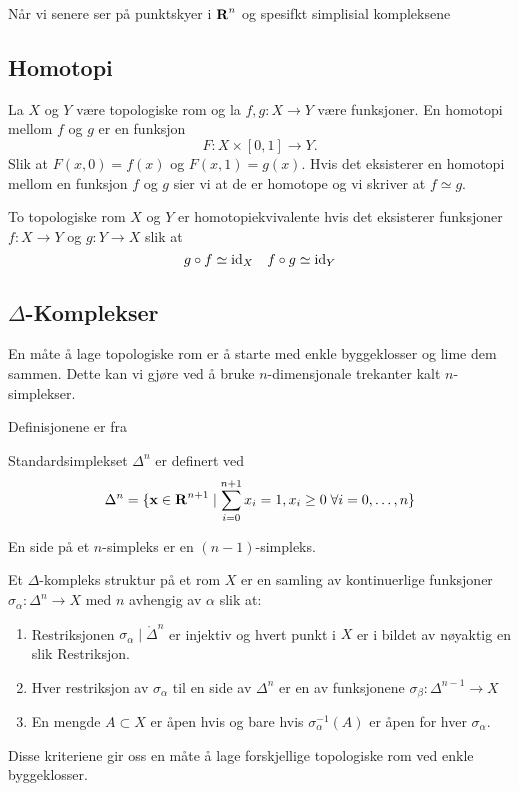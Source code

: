 Når vi senere ser på punktskyer i $\textnormal{\textbf{{R}}}^n$ og spesifkt simplisial kompleksene %

\subsection{Homotopi}\label{sec:Homotopi}
\begin{definisjon}\label{Def:Homotopi}
    La $X$ og $Y$ være topologiske rom og la $f,g: X\to Y$ være funksjoner. En homotopi mellom $f$ og $g$ er en funksjon
    \[F: X\times[0,1]\to Y.\]
    Slik at $F(x,0)=f(x)$ og $F(x,1)=g(x)$.
    Hvis det eksisterer en homotopi mellom en funksjon $f$ og $g$ sier vi at de er homotope og vi skriver at $f\simeq g$.
\end{definisjon}

\begin{definisjon}\label{Def:HomotopiEkv}
    To topologiske rom $X$ og $Y$ er homotopiekvivalente hvis det eksisterer funksjoner $f: X\to Y$ og $g: Y\to X$ slik at
    \[g\circ f\simeq\textnormal{id}_X\quad f\circ g \simeq \textnormal{id}_Y\]
\end{definisjon}



\subsection{$\Delta$-Komplekser}\label{sec:SimpKomp}
En måte å lage topologiske rom er å starte med enkle byggeklosser og lime dem sammen. Dette kan vi gjøre ved å bruke $n$-dimensjonale trekanter kalt $n$-simplekser.

Definisjonene er fra \cite{Hatcher2002}

\begin{definisjon}\label{Def:StndrdSimpKomp}
    Standardsimplekset $\Delta^n$ er definert ved
    \[\Delta^n = \{ \textbf{x}\in\textnormal{\textbf{{R}}}^{n + 1} \mid \sum_{i = 0}^{n + 1}x_i=1, x_i\geq 0\;\forall i=0,\dots,n\}\]
\end{definisjon}

En side på et $n$-simpleks er en $(n-1)$-simpleks.
\begin{definisjon}\label{Def:Deltastrkt}
    Et $\Delta$-kompleks struktur på et rom $X$ er en samling av kontinuerlige funksjoner $\sigma_\alpha: \Delta^n\to X$ med $n$ avhengig av $\alpha$ slik at:
    \begin{enumerate}
        \item Restriksjonen $\sigma_\alpha\mid\mathring{\Delta}^n$ er injektiv og hvert punkt i $X$ er i bildet av nøyaktig en slik Restriksjon.
        \item Hver restriksjon av $\sigma_\alpha$ til en side av $\Delta^n$ er en av funksjonene $\sigma_\beta: \Delta^{n-1}\to X$
        \item En mengde $A\subset X$ er åpen hvis og bare hvis $\sigma_\alpha^{-1}(A)$ er åpen for hver $\sigma_\alpha$.
    \end{enumerate}
\end{definisjon}
Disse kriteriene gir oss en måte å lage forskjellige topologiske rom ved enkle byggeklosser.

